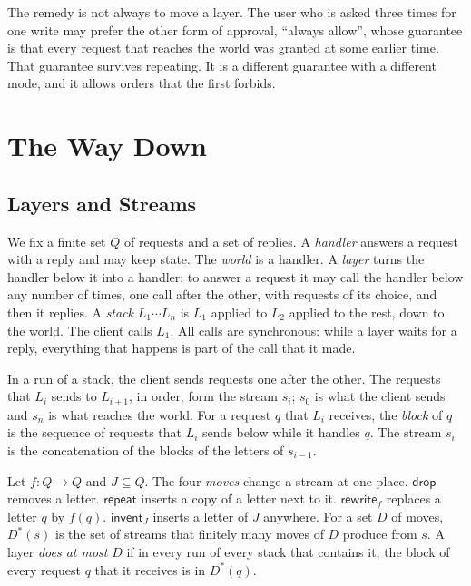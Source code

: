 \documentclass[acmsmall,nonacm,screen]{acmart}
\newcommand{\kw}[1]{\mathsf{#1}}
\newcommand{\drop}{\kw{drop}}
\newcommand{\rep}{\kw{repeat}}
\newcommand{\rew}[1]{\kw{rewrite}_{#1}}
\newcommand{\inv}[1]{\kw{invent}_{#1}}
\newcommand{\clos}[2]{#1^{*}(#2)}
\begin{document}
The remedy is not always to move a layer. The user who is asked three times for one write
may prefer the other form of approval, ``always allow'', whose guarantee is that every
request that reaches the world was granted at some earlier time. That guarantee survives
repeating. It is a different guarantee with a different mode, and it allows orders that the
first forbids.

\section{The Way Down}
\label{sec:down}

\subsection{Layers and Streams}

We fix a finite set $Q$ of requests and a set of replies. A \emph{handler} answers a request
with a reply and may keep state. The \emph{world} is a handler. A \emph{layer} turns the
handler below it into a handler: to answer a request it may call the handler below any number
of times, one call after the other, with requests of its choice, and then it replies. A
\emph{stack} $L_1 \cdots L_n$ is $L_1$ applied to $L_2$ applied to the rest, down to the
world. The client calls $L_1$. All calls are synchronous: while a layer waits for a reply,
everything that happens is part of the call that it made.

In a run of a stack, the client sends requests one after the other. The requests that
$L_i$ sends to $L_{i+1}$, in order, form the stream $s_i$; $s_0$ is what the client sends and
$s_n$ is what reaches the world. For a request $q$ that $L_i$ receives, the \emph{block} of
$q$ is the sequence of requests that $L_i$ sends below while it handles $q$. The stream $s_i$
is the concatenation of the blocks of the letters of $s_{i-1}$.

\begin{definition}[Moves]
\label{def:moves}
Let $f : Q \to Q$ and $J \subseteq Q$. The four \emph{moves} change a stream at one place.
$\drop$ removes a letter. $\rep$ inserts a copy of a letter next to it. $\rew{f}$ replaces a
letter $q$ by $f(q)$. $\inv{J}$ inserts a letter of $J$ anywhere. For a set $D$ of moves,
$\clos{D}{s}$ is the set of streams that finitely many moves of $D$ produce from $s$. A layer
\emph{does at most} $D$ if in every run of every stack that contains it, the block of every
request $q$ that it receives is in $\clos{D}{q}$.
\end{definition}
\end{document}
